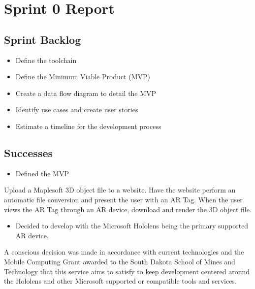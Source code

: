 
\section{Sprint 0 Report}
\label{sec:Sprint0_report}
    \subsection{Sprint Backlog}
    \label{sec:Sprint0_backlog}
        \begin{itemize}
            \item Define the toolchain
            \item Define the Minimum Viable Product (MVP)
            \item Create a data flow diagram to detail the MVP            
            \item Identify use cases and create user stories
            \item Estimate a timeline for the development process
        \end{itemize}

    \subsection{Successes}
    \label{sec:Sprint0_successes}
        \begin{itemize} \item Defined the MVP \end{itemize}
        \hspace{7mm}
        Upload a Maplesoft 3D object file to a website.  Have the website perform an automatic file conversion and 
        present the user with an AR Tag.  When the user views the AR Tag through an AR device, download and render 
        the 3D object file.

        \begin{itemize} \item Decided to develop with the Microsoft Hololens being the primary supported AR device. \end{itemize}
        \hspace{7mm} 
        A conscious decision was made in accordance with current technologies and the Mobile Computing Grant awarded 
        to the South Dakota School of Mines and Technology that this service aims to satisfy to keep development 
        centered around the Hololens and other Microsoft supported or compatible tools and services.

